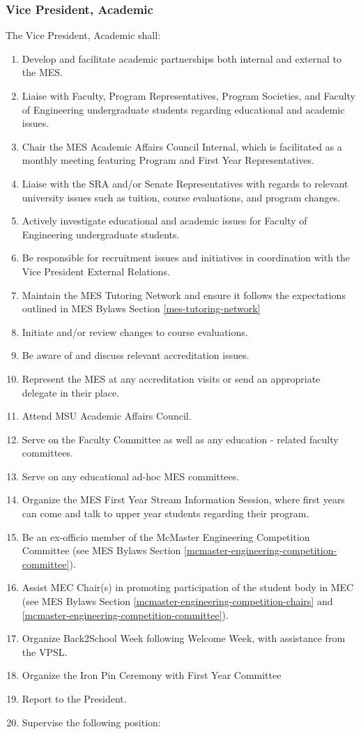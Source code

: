 \subsubsection{Vice President,
  Academic}
\label{vice-president-academic}
The Vice President, Academic shall:

\begin{enumerate}
 \item
  Develop and facilitate academic partnerships both internal and
  external to the MES.
 \item
  Liaise with Faculty, Program Representatives, Program Societies, and
  Faculty of Engineering undergraduate students regarding educational
  and academic issues.
 \item
  Chair the MES Academic Affairs Council Internal, which is facilitated
  as a monthly meeting featuring Program and First Year Representatives.
 \item
  Liaise with the SRA and/or Senate Representatives with regards to
  relevant university issues such as tuition, course evaluations, and
  program changes.
 \item
  Actively investigate educational and academic issues for Faculty of
  Engineering undergraduate students.
 \item
  Be responsible for recruitment issues and initiatives in coordination
  with the Vice President External Relations.
 \item
  Maintain the MES Tutoring Network and ensure it follows the
  expectations outlined in MES Bylaws Section \ref{mes-tutoring-network}
 \item
  Initiate and/or review changes to course evaluations.
 \item
  Be aware of and discuss relevant accreditation issues.
 \item
  Represent the MES at any accreditation visits or send an appropriate
  delegate in their place.
 \item
  Attend MSU Academic Affairs Council.
 \item
  Serve on the Faculty Committee as well as any education - related
  faculty committees.
 \item
  Serve on any educational ad-hoc MES committees.
 \item
  Organize the MES First Year Stream Information Session, where first
  years can come and talk to upper year students regarding their
  program.
 \item
  Be an ex-officio member of the McMaster Engineering Competition
  Committee (see MES Bylaws Section  \ref{mcmaster-engineering-competition-committee}).
 \item
  Assist MEC Chair(s) in promoting participation of the student body in
  MEC (see MES Bylaws Section \ref{mcmaster-engineering-competition-chairs} and \ref{mcmaster-engineering-competition-committee}).
 \item
  Organize Back2School Week following Welcome Week, with assistance from
  the VPSL.
 \item
  Organize the Iron Pin Ceremony with First Year Committee
 \item
  Report to the President.
 \item
  Supervise the following position:


\end{enumerate}
